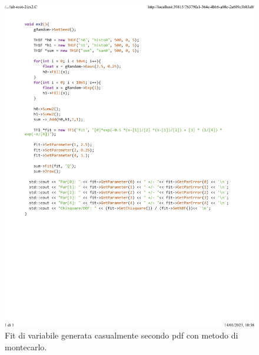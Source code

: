 \documentclass[10pt,a4paper]{article}
\begin{document}
\begin{figure}[h!]
	\centering
	\includegraphics[width=1.\linewidth]{_..._lab-root-2_ex2.C}
	\caption{Fit di variabile generata casualmente secondo pdf con metodo di montecarlo.}
	\label{fig:6}
\end{figure}
\newpage
\end{document}
